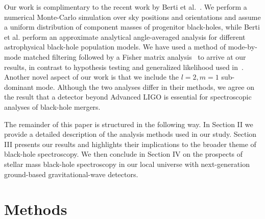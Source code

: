 Our work is complimentary to the recent work by Berti et al.~\cite{2016arXiv160509286B}. We perform a numerical Monte-Carlo simulation over sky positions and orientations and assume a uniform distribution of component masses of progenitor black-holes, while Berti et al. perform an approximate analytical angle-averaged analysis for different astrophysical black-hole population models. We have used a method of mode-by-mode matched filtering followed by a Fisher matrix analysis~\cite{van2004detection} to arrive at our results, in contrast to hypothesis testing and generalized likelihood used in~\cite{2016arXiv160509286B}. Another novel aspect of our work is that we include the $l=2, m=1$ sub-dominant mode. Although the two analyses differ in their methods, we agree on the result that a detector beyond Advanced LIGO is essential for spectroscopic analyses of black-hole mergers. 

The remainder of this paper is structured in the following way. In Section II we provide a detailed description of the analysis methods used in our study. Section III presents our results and highlights their implications to the broader theme of black-hole spectroscopy. We then conclude in Section IV on the prospects of stellar mass black-hole spectroscopy in our local universe with next-generation ground-based gravitational-wave detectors.

\section{Methods}
\label{sec:framework}

